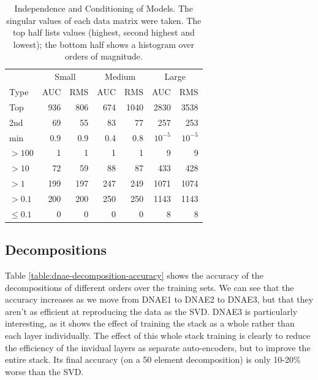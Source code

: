 \documentclass{article}
\begin{document}
\begin{table}[t]
\caption{Independence and Conditioning of Models.  The singular values of each data matrix were taken.  The top half lists values (highest, second highest and lowest); the bottom half shows a histogram over orders of magnitude.}
\label{table:sv-distributions}
\vskip 0.15in
\begin{center}
\begin{small}
\begin{sc}
\begin{tabular}{lrrrrrr}
\hline
\abovespace\belowspace
& \multicolumn{2}{c}{Small} & \multicolumn{2}{c}{Medium} & \multicolumn{2}{c}{Large} \\
Type & AUC & RMS & AUC & RMS & AUC & RMS \\
\hline
\abovespace
Top        & 936 & 806 & 674 & 1040 & 2830   & 3538 \\
2nd        &  69 &  55 &  83 &   77 &  257   &  253 \\
min        & 0.9 & 0.9 & 0.4 &  0.8 & $10^{-5}$& $10^{-5}$ \\
\abovespace
$> 100$    &   1 &   1 &   1 &    1 &    9   &    9 \\
$> 10$     &  72 &  59 &  88 &   87 &  433   &  428 \\
$> 1$      & 199 & 197 & 247 &  249 & 1071   & 1074 \\
$> 0.1$    & 200 & 200 & 250 &  250 & 1143   & 1143 \\
\belowspace
$\leq 0.1$ &   0 &   0 &   0 &    0 &    8   &    8 \\
\hline
\end{tabular}
\end{sc}
\end{small}
\end{center}
\vskip -0.1in
\end{table}

\subsection{Decompositions}

Table \ref{table:dnae-decomposition-accuracy} shows the accuracy of the decompositions of different orders over the training sets.  We can see that the accuracy increases as we move from DNAE1 to DNAE2 to DNAE3, but that they aren't as efficient at reproducing the data as the SVD.  DNAE3 is particularly interesting, as it shows the effect of training the stack as a whole rather than each layer individually.  The effect of this whole stack training is clearly to reduce the efficiency of the invidual layers as separate auto-encoders, but to improve the entire stack.  Its final accuracy (on a 50 element decomposition) is only 10-20\% worse than the SVD.
\end{document}
